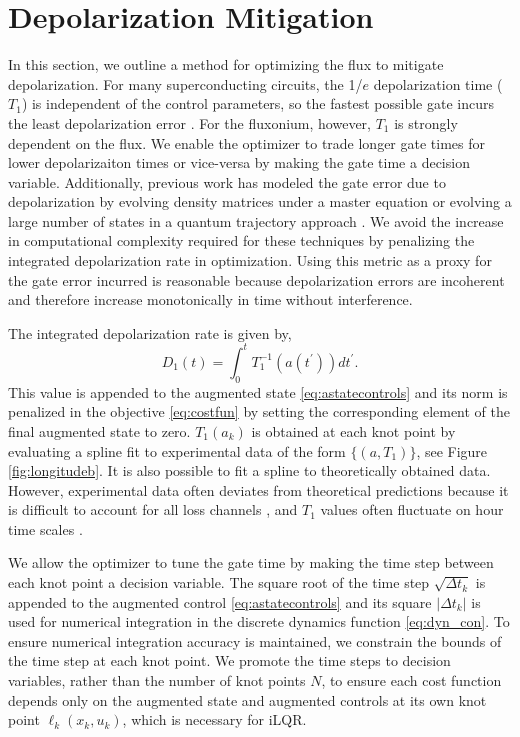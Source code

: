 \section{Depolarization Mitigation\label{sec:longitude}}
In this section, we outline a method
for optimizing the flux to mitigate depolarization.
For many superconducting circuits, the 1/$e$ depolarization time ($T_{1}$) is independent of the control parameters,
so the fastest possible gate incurs the least depolarization error
\cite{schulteherbruggen2011optimal}.
For the fluxonium, however, $T_{1}$ is strongly dependent on the flux.
We enable the optimizer to trade longer gate times
for lower depolarizaiton times or vice-versa by making the gate time a decision variable.
Additionally, previous work has modeled the gate error due to depolarization
by evolving density matrices under a master
equation \cite{rembold2020introduction, schulteherbruggen2011optimal}
or evolving a large number of states in a quantum trajectory approach
\cite{abdelhafez2019gradient}.
We avoid the increase in computational complexity required for these
techniques by penalizing the integrated depolarization rate in optimization.
Using this metric as a proxy for the gate error incurred
is reasonable because depolarization errors are incoherent and therefore
increase monotonically in time without interference.

The integrated depolarization rate is given by,
\begin{equation}
  D_{1}(t) = \int_{0}^{t} T_{1}^{-1}(a(t^{\prime})) dt^{\prime}.
\end{equation}
This value is appended to the augmented state \eqref{eq:astatecontrols}
and its norm is penalized in the objective \eqref{eq:costfun} by setting
the corresponding element of the final augmented state to zero.
$T_{1}(a_{k})$ is obtained at each knot point by evaluating
a spline fit to experimental data of the form $\{(a, T_{1})\}$,
see Figure \ref{fig:longitudeb}.
It is also possible to fit a spline to theoretically obtained data.
However, experimental data often deviates from theoretical predictions
because it is difficult to account for all loss channels \cite{zhang2020universal},
and $T_{1}$ values often fluctuate on hour
time scales \cite{klimov2018fluctuations}.

We allow the optimizer to tune the gate time by
making the time step between each knot point
a decision variable. 
The square root of the time step $\sqrt{\Delta t_{k}}$
is appended to the augmented control \eqref{eq:astatecontrols}
and its square $\lvert \Delta t_{k} \rvert$ is used
for numerical integration in the discrete dynamics function \eqref{eq:dyn_con}.
To ensure numerical
integration accuracy is maintained, we constrain
the bounds of the time step at each knot point.
We promote the time steps
to decision variables, rather
than the number of knot points $N$, to ensure each cost function depends
only on the augmented state and augmented
controls at its own knot point $\ell_{k}(x_{k}, u_{k})$, which is necessary for iLQR.

